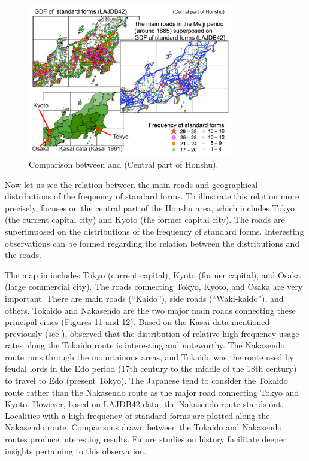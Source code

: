 \documentclass[output=paper]{LSP/langsci}
\begin{document}
\begin{figure}
\includegraphics[width=0.8\textwidth]{illustrations/kuma_fig08}
\caption{Comparison between  and  (Central part of Honshu).}          
\label{fig:kuma:8}
\end{figure} 

Now let us see the relation between the main roads and geographical distributions of the frequency of standard forms. To illustrate this relation more precisely,  focuses on the central part of the Honshu area, which includes Tokyo (the current capital city) and Kyoto (the former capital city). The roads are superimposed on the distributions of the frequency of standard forms. Interesting observations can be formed regarding the relation between the distributions and the roads.

\largerpage[2]
The map in  includes Tokyo (current capital), Kyoto (former capital), and Osaka (large commercial city). The roads connecting Tokyo, Kyoto, and Osaka are very important. There are main roads (“Kaido”), side roads (“Waki-kaido”), and others. Tokaido and Nakasendo are the two major main roads connecting these principal cities (Figures 11 and 12). Based on the Kasai data mentioned previously (see ), \citet[184]{tanaka_hyojungo:_1991} observed that the distribution of relative high frequency usage rates along the Tokaido route is interesting and noteworthy. The Nakasendo route runs through the mountainous areas, and Tokaido was the route used by feudal lords in the Edo period (17th century to the middle of the 18th century) to travel to Edo (present Tokyo). The Japanese tend to consider the Tokaido route rather than the Nakasendo route as the major road connecting Tokyo and Kyoto. However, based on LAJDB42 data, the Nakasendo route stands out. Localities with a high frequency of standard forms are plotted along the Nakasendo route. Comparisons drawn between the Tokaido and Nakasendo routes produce interesting results. Future studies on  history facilitate deeper insights pertaining to this observation.
\end{document}
